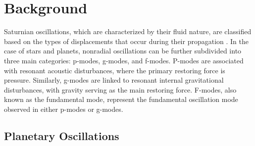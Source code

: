 \documentclass{article}
\begin{document}

\section{Background}
Saturnian oscillations, which are characterized by their fluid nature, are classified based on the types of displacements that occur during their propagation \cite{Marley1993PlanetaryAM}. In the case of stars and planets, nonradial oscillations can be further subdivided into three main categories: p-modes, g-modes, and f-modes. P-modes are associated with resonant acoustic disturbances, where the primary restoring force is pressure. Similarly, g-modes are linked to resonant internal gravitational disturbances, with gravity serving as the main restoring force. F-modes, also known as the fundamental mode, represent the fundamental oscillation mode observed in either p-modes or g-modes.


\subsection{Planetary Oscillations}
\end{document}
